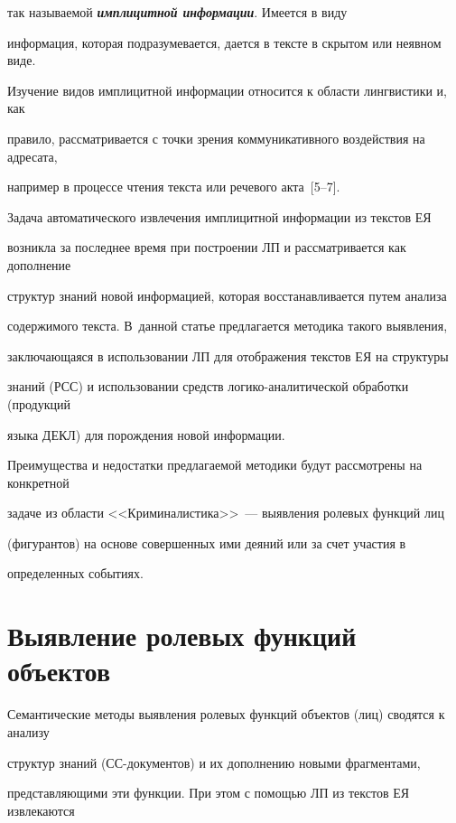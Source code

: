 так называемой {\bfseries\textit{имплицитной информации}}. Имеется в виду 


информация, которая подразумевается, дается в тексте в скрытом или неявном виде. 


Изучение видов имплицитной информации относится к области лингвистики и, как 


правило, рассматривается с точки зрения коммуникативного воздействия на адресата, 


например в процессе чтения текста или речевого акта~[5--7]. 


Задача автоматического извлечения имплицитной информации из текстов ЕЯ 


возник\-ла за последнее время при построении ЛП и рассматривается как дополнение 


структур знаний новой информацией, которая восстанавливается путем анализа 


содержимого  текста. В~данной статье предлагается методика такого выявления, 


заключающаяся в использовании ЛП для отображения текстов ЕЯ на структуры 


знаний (РСС) и использовании средств логико-аналитической обработки (продукций 


языка ДЕКЛ) для порождения новой информации. 





Преимущества и недостатки предлагаемой методики будут рассмотрены на конкретной 


задаче из области <<Криминалистика>>~--- выявления ролевых функций лиц 


(фигурантов) на основе совершенных ими деяний или за счет участия в 


определенных событиях.   





             


\section{Выявление ролевых функций объектов}





   Семантические методы выявления ролевых функций объектов (лиц) сводятся к анализу 


структур знаний (СС-документов) и их дополнению новыми фрагментами, 


представляющими эти функции. При этом с помощью ЛП из текстов ЕЯ извлекаются 


